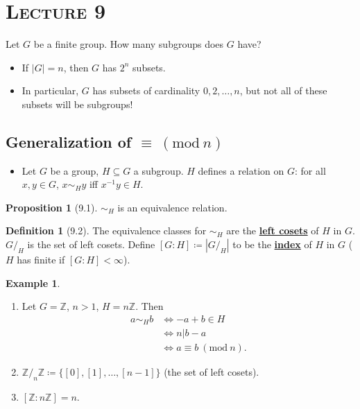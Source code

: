 \documentclass{article}
\newcommand{\Z}{\mathbb{Z}}
\newcommand{\coleq}{\coloneqq}
\newcommand{\inverse}[1]{#1^{-1}}
\newcommand{\define}[1]{\textbf{\underline{#1}}}
\renewcommand{\mod}[1]{\ (\mathrm{mod}\ #1)}
\theoremstyle{definition}
\newtheorem*{defn}{Definition}
\newtheorem*{prop}{Proposition}
\newtheorem*{ex}{Example}
\theoremstyle{remark}
\begin{document}
    \noindent\section*{\textbf{\textsc{Lecture 9}}}{
        Let $G$ be a finite group. How many subgroups does $G$ have?
        \begin{itemize}
            \item If $|G|=n$, then $G$ has $2^n$ subsets.
            \item In particular, $G$ has subsets of cardinality $0,2,\ldots,n$, but not all of these subsets will be subgroups!
        \end{itemize}
        \subsection*{Generalization of $\equiv\mod n$}{
            \begin{itemize}
                \item Let $G$ be a group, $H \subseteq G$ a subgroup. $H$ defines a relation on $G$: for all $x,y \in G$, $x \sim_H y$ iff $\inverse{x}y \in H$.
            \end{itemize}
        
            \begin{prop}[9.1]
                $\sim_H$ is an equivalence relation.
            \end{prop}
            
            \begin{defn}[9.2]\hfill
                The equivalence classes for $\sim_H$ are the \define{left cosets} of $H$ in $G$. $G/_H$ is the set of left cosets. Define $[G:H] \coleq |G/_H|$ to be the \define{index} of $H$ in $G$ ($H$ has finite if $[G:H]< \infty$).
            \end{defn}
            
            \begin{ex}\hfill
                \begin{enumerate}
                    \item Let $G=\Z$, $n>1$, $H=n\Z$. Then
                \begin{align*}
                    a \sim_H b &\iff-a+b \in H\\
                    &\iff n|b-a\\
                    &\iff a \equiv b\mod n.
                \end{align*}
                    \item $\Z/_n\Z \coleq \{[0],[1],\ldots,[n-1]\}$ (the set of left cosets).
                    \item $[\Z:n\Z]=n$.
                \end{enumerate}
            \end{ex}
            
}}
\end{document}
